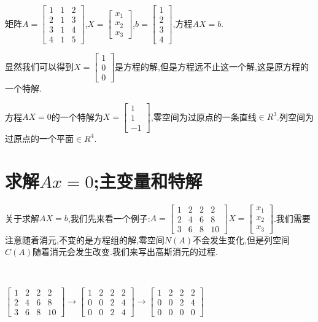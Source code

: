 \documentclass[oneside]{book}
\begin{document}
	 矩阵$A=\left[\begin{array}{ccc}
	 	1 & 1 & 2\\
	 	2 & 1 & 3\\
	 	3 & 1 & 4\\
	 	4 & 1 & 5
	 \end{array}\right]$,$X=\left[\begin{array}{c}
	 x_{1}\\x_{2}\\x_{3}
 \end{array}\right]$,$b=\left[\begin{array}{c}
 1\\2\\3\\4
\end{array}\right]$,方程$AX=b$.

显然我们可以得到$X=\left[\begin{array}{c}
	1\\0\\0
\end{array}\right]$是方程的解,但是方程远不止这一个解,这是原方程的一个特解.

方程$AX=0$的一个特解为$X=\left[\begin{array}{c}
	1\\1\\-1
\end{array}\right]$,零空间为过原点的一条直线$ \in R^{3} $.列空间为过原点的一个平面$\in R^{4}$.
	 
	 
	\chapter{求解$Ax=0$;主变量和特解}
	关于求解$AX=b$,我们先来看一个例子:$A=\left[\begin{array}{cccc}1&2&2&2\\2&4&6&8\\3&6&8&10
	\end{array}\right] X=\left[\begin{array}{c}
	x_{1}\\x_{2}\\x_{3}
\end{array}\right]$.我们需要注意随着消元,不变的是方程组的解,零空间$N(A)$不会发生变化,但是列空间$C(A)$随着消元会发生改变.我们来写出高斯消元的过程.

\hspace{\fill}\

	$\left[\begin{array}{cccc}1&2&2&2\\2&4&6&8\\3&6&8&10
	\end{array}\right]\rightarrow \left[\begin{array}{cccc}1&2&2&2\\0&0&2&4\\0&0&2&4
\end{array}\right]\rightarrow \left[\begin{array}{cccc}1&2&2&2\\0&0&2&4\\0&0&0&0
\end{array}\right]$ 
\end{document}
